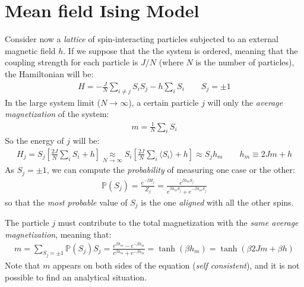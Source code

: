 \documentclass[../template.tex]{subfiles}
\begin{document}
\section{Mean field Ising Model}
Consider now a \textit{lattice} of spin-interacting particles subjected to an external magnetic field $h$. If we suppose that the the system is ordered, meaning that the coupling strength for each particle is $J/N$ (where $N$ is the number of particles), the Hamiltonian will be:
\begin{align*}
    H = - \frac{J}{N} \sum_{i\neq j} S_i S_j - h \sum_i S_i \qquad S_j = \pm 1 
\end{align*}   
In the large system limit ($N \to \infty$), a certain particle $j$ will  only the \textit{average magnetization} of the system:
\begin{align*}
    m = \frac{1}{N} \sum_i S_i 
\end{align*}  
So the energy of $j$ will be:
\begin{align*}
    H_j = S_j \left[\frac{2 J}{N} \sum_i S_i + h \right] \underset{N \to \infty}{\approx } S_i \left[\frac{2J}{N} \sum_i \langle S_i \rangle + h\right] \approx S_j h_m \qquad h_m \equiv 2 Jm + h
\end{align*} 
As $S_j = \pm 1$, we can compute the \textit{probability} of measuring one case or the other:
\begin{align*}
    \mathbb{P}(S_j) = \frac{e^{-\beta H_j}}{Z_j} = \frac{e^{\beta h_m S_j}}{e^{\beta h_m S_j} + e^{-\beta h_m S_j}}  
\end{align*}   
so that the \textit{most probable} value of $S_j$ is the one \textit{aligned} with all the other spins.

The particle $j$ must contribute to the total magnetization with the \textit{same average magnetization}, meaning that:
\begin{align*}
    m = \sum_{S_j = \pm 1} \mathbb{P}(S_j) S_j = \frac{e^{\beta h_m} - e^{-\beta h_m}}{e^{\beta h_m} + e^{-\beta h_m}} = \tanh(\beta h_m) = \tanh \left(\beta 2Jm + \beta h \right)
\end{align*} 
Note that $m$ appears on both sides of the equation (\textit{self consistent}), and it is not possible to find an analytical situation.
\end{document}
